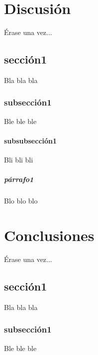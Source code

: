 \documentclass[a4paper,openright,12pt]{report}
\begin{document}
\chapter{Discusión}\label{cap.discusión}
Érase una vez...
\section{sección1}
Bla bla bla
\subsection{subsección1}
Ble ble ble
\subsubsection{subsubsección1}
Bli bli bli
\paragraph{párrafo1}
Blo blo blo

\chapter{Conclusiones}\label{cap.conclusiones}
Érase una vez...
\section{sección1}
Bla bla bla
\subsection{subsección1}
Ble ble ble
\end{document}
